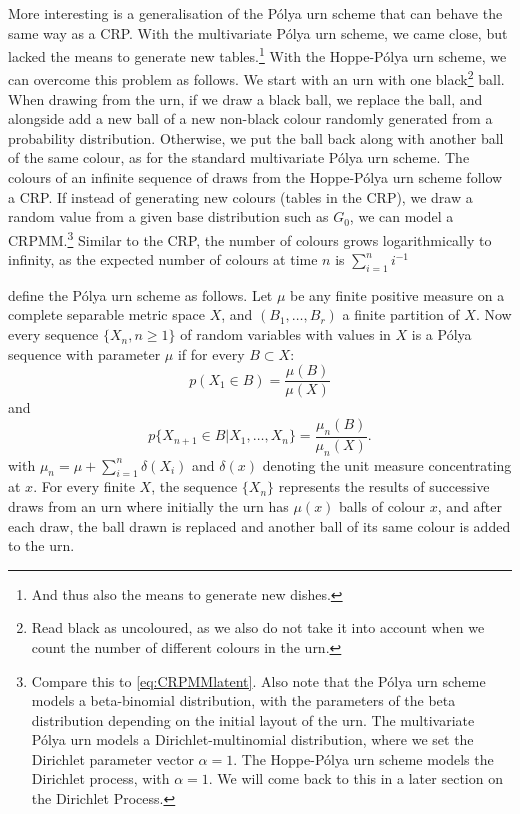 More interesting is a generalisation of the P\'olya urn scheme that can behave the same way as a CRP. With the multivariate P\'olya urn scheme, we came close, but lacked the means to generate new tables.\footnote{And thus also the means to generate new dishes.} With the Hoppe-P\'olya urn scheme\cite{Hoppe1984Polya}, we can overcome this problem as follows. We start with an urn with one black\footnote{Read black as uncoloured, as we also do not take it into account when we count the number of different colours in the urn.} ball. When drawing from the urn, if we draw a black ball, we replace the ball, and alongside add a new ball of a new non-black colour randomly generated from a probability distribution. Otherwise, we put the ball back along with another ball of the same colour, as for the standard multivariate P\'olya urn scheme. The colours of an infinite sequence of draws from the Hoppe-P\'olya urn scheme follow a CRP. If instead of generating new colours (tables in the CRP), we draw a random value from a given base distribution such as $G_0$, we can model a CRPMM.\footnote{Compare this to \cref{eq:CRPMMlatent}. Also note that the P\'olya urn scheme models a beta-binomial distribution, with the parameters of the beta distribution depending on the initial layout of the urn. The multivariate P\'olya urn models a Dirichlet-multinomial distribution, where we set the Dirichlet parameter vector $\alpha=1$. The Hoppe-P\'olya urn scheme models the Dirichlet process, with $\alpha=1$. We will come back to this in a later section on the Dirichlet Process.} Similar to the CRP, the number of colours grows logarithmically to infinity, as the expected number of colours at time $n$ is $\sum_{i=1}^n i^{-1}$

\textcite{Blackwell1973Ferguson} define the P\'olya urn scheme as follows. Let $\mu$ be any finite positive measure on a complete separable metric space $X$, and $(B_1,\dots,B_r)$ a finite partition of $X$. Now every sequence $\{X_n,n\geq 1\}$ of random variables with values in $X$ is a P\'olya sequence with parameter $\mu$ if for every $B\subset X$:
\begin{equation}
	p(X_1\in B) = \frac{\mu(B)}{\mu(X)}
\end{equation}
and
\begin{equation}
	p\{X_{n+1}\in B | X_1,\ldots,X_n\} = \frac{\mu_n(B)}{\mu_n(X)}.
\end{equation}
with $\mu_n = \mu + \sum_{i=1}^n \delta(X_i)$ and $\delta(x)$ denoting the unit measure concentrating at $x$. For every finite $X$, the sequence $\{X_n\}$ represents the results of successive draws from an urn where initially the urn has $\mu(x)$ balls of colour $x$, and after each draw, the ball drawn is replaced and another ball of its same colour is added to the urn.

